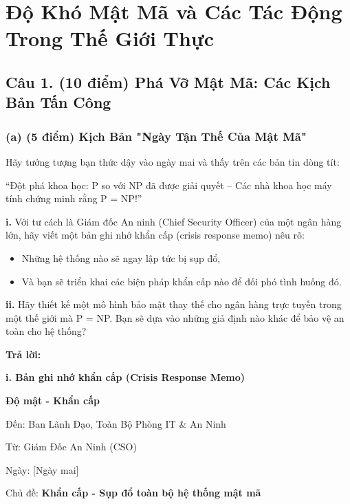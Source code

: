 \section{Độ Khó Mật Mã và Các Tác Động Trong Thế Giới Thực}

\subsection{Câu 1. (10 điểm) Phá Vỡ Mật Mã: Các Kịch Bản Tấn Công}

\subsubsection{(a) (5 điểm) Kịch Bản "Ngày Tận Thế Của Mật Mã"}

Hãy tưởng tượng bạn thức dậy vào ngày mai và thấy trên các bản tin dòng tít:

``Đột phá khoa học: P so với NP đã được giải quyết – Các nhà khoa học máy tính chứng minh rằng P = NP!''

\textbf{i.} Với tư cách là Giám đốc An ninh (Chief Security Officer) của một ngân hàng lớn, hãy viết một bản ghi nhớ khẩn cấp (crisis response memo) nêu rõ:
\begin{itemize}
    \item Những hệ thống nào sẽ ngay lập tức bị sụp đổ,
    \item Và bạn sẽ triển khai các biện pháp khẩn cấp nào để đối phó tình huống đó.
\end{itemize}

\textbf{ii.} Hãy thiết kế một mô hình bảo mật thay thế cho ngân hàng trực tuyến trong một thế giới mà P = NP.
Bạn sẽ dựa vào những giả định nào khác để bảo vệ an toàn cho hệ thống?

\begin{center}
    \textbf{Trả lời:}
\end{center}

\textbf{i. Bản ghi nhớ khẩn cấp (Crisis Response Memo)}

\noindent\textbf{Độ mật - Khẩn cấp}

\noindent Đến: Ban Lãnh Đạo, Toàn Bộ Phòng IT \& An Ninh

\noindent Từ: Giám Đốc An Ninh (CSO)

\noindent Ngày: [Ngày mai]

\noindent Chủ đề: \textbf{Khẩn cấp - Sụp đổ toàn bộ hệ thống mật mã}

\vspace{0.3cm}


